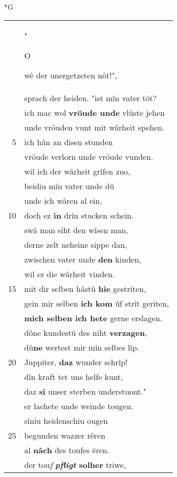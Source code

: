\documentclass[8pt,a4paper,notitlepage]{article}
\begin{document}
\newpage
\begin{table}[ht]
\begin{minipage}[t]{0.5\linewidth}
\small
\begin{center}*G
\end{center}
\begin{tabular}{rl}
 & "\begin{large}O\end{large}wê der unergetzeten nôt!",\\ 
 & sprach der heiden. "ist mîn vater tôt?\\ 
 & ich mac wol \textbf{vröude unde} vlüste jehen\\ 
 & unde vröuden vunt mit wârheit spehen.\\ 
5 & ich hân an disen stunden\\ 
 & vröude verlorn unde vröude vunden.\\ 
 & wil ich der wârheit grîfen zuo,\\ 
 & beidiu mîn vater unde dû\\ 
 & unde ich wâren al ein,\\ 
10 & doch ez \textbf{in} drîn stucken schein.\\ 
 & swâ man siht den wîsen man,\\ 
 & derne zelt neheine sippe dan,\\ 
 & zwischen vater unde \textbf{den} kinden,\\ 
 & wil er die wârheit vinden.\\ 
15 & mit dir selben hâstû \textbf{hie} gestriten,\\ 
 & gein mir selben \textbf{ich kom} ûf strît geriten,\\ 
 & \textbf{mich selben ich hete} gerne erslagen.\\ 
 & dône kundestû des niht \textbf{verzagen},\\ 
 & dû\textbf{ne} wertest mir mîn selbes lîp.\\ 
20 & Juppiter, \textbf{daz} wunder schrîp!\\ 
 & dîn kraft tet uns helfe kunt,\\ 
 & daz \textbf{si} unser sterben understuont."\\ 
 & er lachete unde weinde tougen.\\ 
 & sîniu heidenschiu ougen\\ 
25 & begunden wazzer rêren\\ 
 & al \textbf{nâch} des toufes êren.\\ 
 & der tou\textit{f} \textbf{\textit{pfligt} solher} triwe,\\ 

\end{tabular}
\end{minipage}
\end{table}
\end{document}
